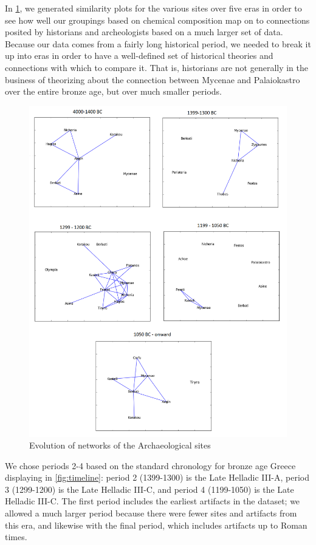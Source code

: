 


In \cref{fig:evolution}, we generated similarity plots for the various sites over five eras in order to see how well our groupings based on chemical composition map on to connections posited by historians and archeologists based on a much larger set of data. Because our data comes from a fairly long historical period, we needed to break it up into eras in order to have a well-defined set of historical theories and connections with which to compare it. That is, historians are not generally in the business of theorizing about the connection between Mycenae and Palaiokastro over the entire bronze age, but over much smaller periods. 



\begin{figure}
\includegraphics[width=\textwidth]{Network_evolution.png}
\caption{Evolution of networks of the Archaeological sites}
\label{fig:evolution}
\end{figure}


We chose periods 2-4 based on the standard chronology for bronze age Greece displaying in \cref{fig:timeline}: period 2 (1399-1300) is the Late Helladic III-A, period 3 (1299-1200) is the Late Helladic III-C, and period 4 (1199-1050) is the Late Helladic III-C. The first period includes the earliest artifacts in the dataset; we allowed a much larger period because there were fewer sites and artifacts from this era, and likewise with the final period, which includes artifacts up to Roman times. 
  
